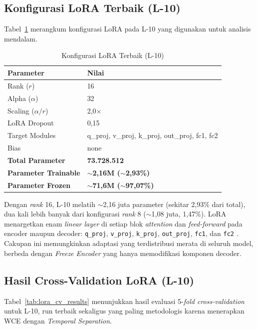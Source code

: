 \subsection{Konfigurasi LoRA Terbaik (L-10)}

Tabel~\ref{tab:lora_config} merangkum konfigurasi LoRA pada L-10 yang digunakan untuk analisis mendalam.

\begin{table}[H]
\centering
\caption{Konfigurasi LoRA Terbaik (L-10)}
\label{tab:lora_config}
\begin{tabular}{|l|l|}
\hline
\textbf{Parameter} & \textbf{Nilai} \\
\hline
Rank ($r$) & 16 \\
\hline
Alpha ($\alpha$) & 32 \\
\hline
Scaling ($\alpha / r$) & 2,0$\times$ \\
\hline
LoRA Dropout & 0,15 \\
\hline
Target Modules & q\_proj, v\_proj, k\_proj, out\_proj, fc1, fc2 \\
\hline
Bias & none \\
\hline
\hline
\textbf{Total Parameter} & \textbf{73.728.512} \\
\hline
\textbf{Parameter Trainable} & \textbf{$\sim$2,16M ($\sim$2,93\%)} \\
\hline
\textbf{Parameter Frozen} & \textbf{$\sim$71,6M ($\sim$97,07\%)} \\
\hline
\end{tabular}
\end{table}

Dengan \textit{rank} 16, L-10 melatih $\sim$2,16 juta parameter (sekitar 2,93\% dari total), dua kali lebih banyak dari konfigurasi \textit{rank} 8 ($\sim$1,08 juta, 1,47\%). LoRA menargetkan enam \textit{linear layer} di setiap blok \textit{attention} dan \textit{feed-forward} pada encoder maupun decoder: \texttt{q\_proj}, \texttt{v\_proj}, \texttt{k\_proj}, \texttt{out\_proj}, \texttt{fc1}, dan \texttt{fc2} \cite{hu2022lora}. Cakupan ini memungkinkan adaptasi yang terdistribusi merata di seluruh model, berbeda dengan \textit{Freeze Encoder} yang hanya memodifikasi komponen decoder.

\subsection{Hasil Cross-Validation LoRA (L-10)}

Tabel~\ref{tab:lora_cv_results} menunjukkan hasil evaluasi 5-\textit{fold cross-validation} untuk L-10, run terbaik sekaligus yang paling metodologis karena menerapkan WCE dengan \textit{Temporal Separation}.

